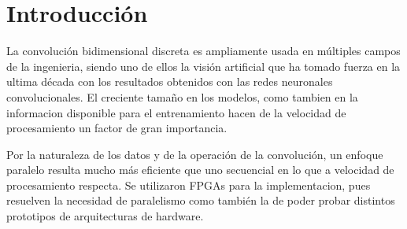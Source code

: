 \documentclass[conference,compsoc]{IEEEtran}
\begin{document}




\maketitle

\begin{abstract}
  En este art\'iculo se presenta una arquitectura de hardware para realizar una
  convoluci\'on 2D en una FPGA cuando no se puede instanciar suficiente memoria
  RAM para poder alojar la imagen completa. Se prioriz\'o la velocidad de
  procesamiento, el uso eficiente de los recursos y un dise\~no escalable donde
  se pudieran agregar tantas operaciones de convoluci\'on en paralelo como se
  desee sin deber hacer grandes modificaciones en el dise\~no.
\end{abstract}





%
\IEEEpeerreviewmaketitle



\section{Introducci\'on}
La convoluci\'on bidimensional discreta es ampliamente usada en múltiples campos de la
ingenieria, siendo uno de ellos la visi\'on artificial que ha tomado fuerza en la
ultima d\'ecada con los resultados obtenidos con las redes neuronales
convolucionales. El creciente tama\~no en los modelos, como tambien en la
informacion disponible para el entrenamiento hacen de la velocidad de
procesamiento un factor de gran importancia.

Por la naturaleza de los datos y de la operaci\'on de la convoluci\'on, un enfoque
paralelo resulta mucho m\'as eficiente que uno secuencial en lo que a velocidad de
procesamiento respecta. Se utilizaron FPGAs para la implementacion, pues
resuelven la necesidad de paralelismo como tambi\'en la de poder
probar distintos prototipos de arquitecturas de hardware.
\end{document}
